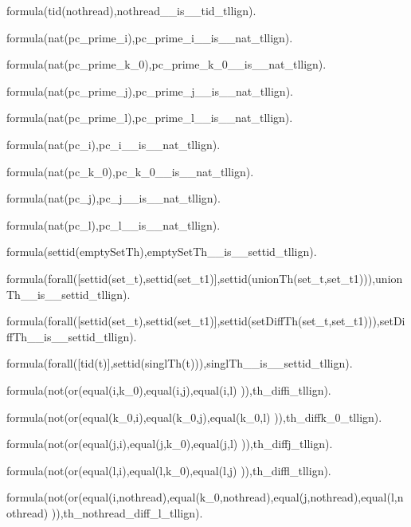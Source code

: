 
formula(tid(nothread),nothread\_\_is\_\_tid\_tllign).

formula(nat(pc\_prime\_i),pc\_prime\_i\_\_is\_\_nat\_tllign).

formula(nat(pc\_prime\_k\_0),pc\_prime\_k\_0\_\_is\_\_nat\_tllign).

formula(nat(pc\_prime\_j),pc\_prime\_j\_\_is\_\_nat\_tllign).

formula(nat(pc\_prime\_l),pc\_prime\_l\_\_is\_\_nat\_tllign).

formula(nat(pc\_i),pc\_i\_\_is\_\_nat\_tllign).

formula(nat(pc\_k\_0),pc\_k\_0\_\_is\_\_nat\_tllign).

formula(nat(pc\_j),pc\_j\_\_is\_\_nat\_tllign).

formula(nat(pc\_l),pc\_l\_\_is\_\_nat\_tllign).


formula(settid(emptySetTh),emptySetTh\_\_is\_\_settid\_tllign).

formula(forall([settid(set\_t),settid(set\_t1)],settid(unionTh(set\_t,set\_t1))),unionTh\_\_is\_\_settid\_tllign).

formula(forall([settid(set\_t),settid(set\_t1)],settid(setDiffTh(set\_t,set\_t1))),setDiffTh\_\_is\_\_settid\_tllign).

formula(forall([tid(t)],settid(singlTh(t))),singlTh\_\_is\_\_settid\_tllign).

formula(not(or(equal(i,k\_0),equal(i,j),equal(i,l) )),th\_diffi\_tllign).

formula(not(or(equal(k\_0,i),equal(k\_0,j),equal(k\_0,l) )),th\_diffk\_0\_tllign).

formula(not(or(equal(j,i),equal(j,k\_0),equal(j,l) )),th\_diffj\_tllign).

formula(not(or(equal(l,i),equal(l,k\_0),equal(l,j) )),th\_diffl\_tllign).

formula(not(or(equal(i,nothread),equal(k\_0,nothread),equal(j,nothread),equal(l,nothread) )),th\_nothread\_diff\_l\_tllign).




